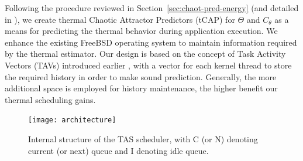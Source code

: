 \documentclass[times, 10pt,twocolumn]{IEEEtran}
\begin{document}
Following the procedure reviewed in Section~\ref{sec:chaot-pred-energy}
(and detailed in \cite{Lewis2010}), we create thermal Chaotic Attractor
Predictors (tCAP) for $\Theta$ and $C_{\theta}$ as a means for
predicting the thermal behavior during application execution.  We
enhance the existing FreeBSD operating system to maintain information
required by the thermal estimator.  Our design is based on the
concept of Task Activity Vectors (TAVs) introduced earlier
\cite{Merkel2008a}, with a vector for each kernel thread to store the
required history in order to make sound prediction.  Generally, the more
additional space is employed for history maintenance, the higher benefit
our thermal scheduling gains.

\begin{figure}[b]
  \centering
  \texttt{[image: architecture]}
  \caption{Internal structure of the TAS scheduler, with C (or N) denoting current (or next) queue and I denoting idle queue.}
  \label{fig:tasque}
\end{figure}
\end{document}
